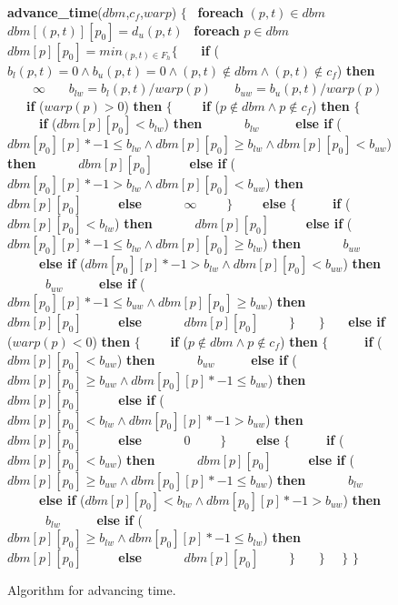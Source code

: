 \documentclass[11pt,times]{article}
\begin{document}
  \begin{figure}[t]
    \begin{algorithm}
      \small {\bf{advance\_time}}($dbm$,$c_f$,$warp$) $\{$
      \ {\bf{foreach}} $(p, t) \in dbm$ 
      \ \ $dbm[(p, t)][p_0] = d_u(p, t)$
      \ {\bf{foreach}} $p \in dbm$
      \ \ $dbm[p][p_0] =  min_{(p, t) \in F_h} \{$
      \ \ \ {\bf{if}} ($b_l(p, t) = 0 \wedge b_u(p, t) = 0 \wedge (p,t) \not \in dbm \wedge (p,t) \not \in c_f$) {\bf{then}}
      \ \ \ \ $\infty$
      \ \ \ $b_{lw} = b_l(p, t) / warp(p)$
      \ \ \ $b_{uw} = b_u(p, t) / warp(p)$
      \ \ \ {\bf{if}} ($warp(p) > 0$) {\bf{then}} $\{$
      \ \ \ \ {\bf{if}} ($p \not \in dbm \wedge p \not \in c_f$) {\bf{then}} $\{$
      \ \ \ \ \ {\bf{if}} ($dbm[p][p_0] < b_{lw}$) {\bf{then}}
      \ \ \ \ \ \ $b_{lw}$
      \ \ \ \ \ {\bf{else if}} ($dbm[p_0][p] * -1 \le b_{lw} \wedge dbm[p][p_0] \ge b_{lw} \wedge dbm[p][p_0] < b_{uw}$) {\bf{then}}
      \ \ \ \ \ \ $dbm[p][p_0]$
      \ \ \ \ \ {\bf{else if}} ($dbm[p_0][p] * -1 > b_{lw} \wedge dbm[p][p_0] < b_{uw}$) {\bf{then}}
      \ \ \ \ \ \ $dbm[p][p_0]$
      \ \ \ \ \ {\bf{else}}
      \ \ \ \ \ \ $\infty$
      \ \ \ \ $\}$
      \ \ \ \ {\bf{else}} $\{$
      \ \ \ \ \ {\bf{if}} ($dbm[p][p_0] < b_{lw}$) {\bf{then}}
      \ \ \ \ \ \ $dbm[p][p_0]$
      \ \ \ \ \ {\bf{else if}} ($dbm[p_0][p] * -1 \le b_{lw} \wedge dbm[p][p_0] \ge b_{lw}$) {\bf{then}}
      \ \ \ \ \ \ $b_{uw}$
      \ \ \ \ \ {\bf{else if}} ($dbm[p_0][p] * -1 > b_{lw} \wedge dbm[p][p_0] < b_{uw}$) {\bf{then}}
      \ \ \ \ \ \ $b_{uw}$
      \ \ \ \ \ {\bf{else if}} ($dbm[p_0][p] * -1 \le b_{uw} \wedge dbm[p][p_0] \ge b_{uw}$) {\bf{then}}
      \ \ \ \ \ \ $dbm[p][p_0]$
      \ \ \ \ \ {\bf{else}}
      \ \ \ \ \ \ $dbm[p][p_0]$
      \ \ \ \ $\}$
      \ \ \ $\}$
      \ \ \ {\bf{else if}} ($warp(p) < 0$) {\bf{then}} $\{$
      \ \ \ \ {\bf{if}} ($p \not \in dbm \wedge p \not \in c_f$) {\bf{then}} $\{$
      \ \ \ \ \ {\bf{if}} ($dbm[p][p_0] < b_{uw}$) {\bf{then}}
      \ \ \ \ \ \ $b_{uw}$
      \ \ \ \ \ {\bf{else if}} ($dbm[p][p_0] \ge b_{uw} \wedge dbm[p_0][p] * -1 \le b_{uw}$) {\bf{then}}
      \ \ \ \ \ \ $dbm[p][p_0]$
      \ \ \ \ \ {\bf{else if}} ($dbm[p][p_0] < b_{lw} \wedge dbm[p_0][p] * -1 > b_{uw}$) {\bf{then}}
      \ \ \ \ \ \ $dbm[p][p_0]$
      \ \ \ \ \ {\bf{else}}
      \ \ \ \ \ \ $0$
      \ \ \ \ $\}$
      \ \ \ \ {\bf{else}} $\{$
      \ \ \ \ \ {\bf{if}} ($dbm[p][p_0] < b_{uw}$) {\bf{then}}
      \ \ \ \ \ \ $dbm[p][p_0]$
      \ \ \ \ \ {\bf{else if}} ($dbm[p][p_0] \ge b_{uw} \wedge dbm[p_0][p] * -1 \le b_{uw}$) {\bf{then}}
      \ \ \ \ \ \ $b_{lw}$
      \ \ \ \ \ {\bf{else if}} ($dbm[p][p_0] < b_{lw} \wedge dbm[p_0][p] * -1 > b_{uw}$) {\bf{then}}
      \ \ \ \ \ \ $b_{lw}$
      \ \ \ \ \ {\bf{else if}} ($dbm[p][p_0] \ge b_{lw} \wedge dbm[p_0][p] * -1 \le b_{lw}$) {\bf{then}}
      \ \ \ \ \ \ $dbm[p][p_0]$
      \ \ \ \ \ {\bf{else}}
      \ \ \ \ \ \ $dbm[p][p_0]$
      \ \ \ \ $\}$
      \ \ \ $\}$
      \ \ $\}$
      $\}$
    \end{algorithm}
    \caption{\label{adv_time}Algorithm for advancing time.}
  \end{figure}
\end{document}
